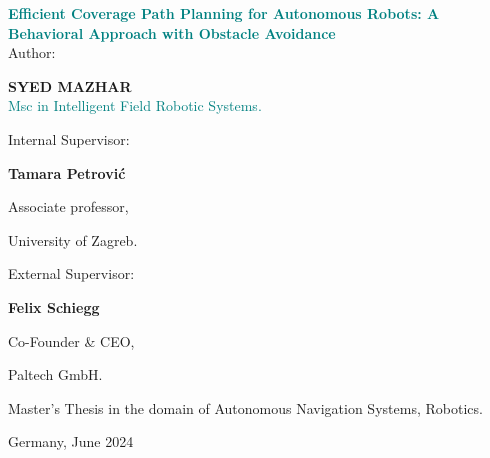 \begin{titlepage}
\vspace*{15mm}  

\centering
\LARGE{\textcolor{teal}{\textbf{Efficient Coverage Path Planning for Autonomous Robots: A Behavioral Approach with Obstacle Avoidance}}}\\[1in]

\normalsize{Author:}

\normalsize{\textbf{SYED MAZHAR}}\\
\normalsize{\textcolor{teal}{Msc in Intelligent Field Robotic Systems.}}\\[0.2in]

\vspace*{15mm}  

\begin{minipage}[t]{0.45\textwidth}
    \centering
    Internal Supervisor: 
    \vspace*{3mm}  

    \textbf{Tamara Petrović}

    Associate professor,

    University of Zagreb.
\end{minipage}
\hfill
\begin{minipage}[t]{0.45\textwidth}
    \centering
    External Supervisor: 

    \vspace*{3mm} 

    \textbf{Felix Schiegg}

    Co-Founder \& CEO,

    Paltech GmbH.

\end{minipage}

\vspace*{30mm}  

\large{Master's Thesis in the domain of Autonomous Navigation Systems, Robotics.}\\[1in]


\vspace*{10mm}  


\normalsize{Germany, June 2024}

\end{titlepage}